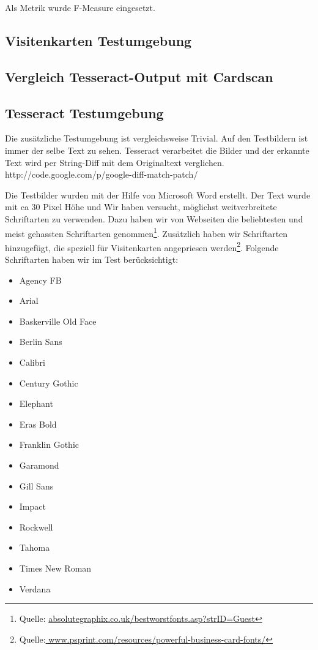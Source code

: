 \documentclass[10pt]{article}
\begin{document}
Als Metrik wurde F-Measure eingesetzt. 

\subsection{Visitenkarten Testumgebung}
\subsection{Vergleich Tesseract-Output mit Cardscan}

\subsection{Tesseract Testumgebung}
Die zusätzliche Testumgebung ist vergleichsweise Trivial. Auf den Testbildern ist immer der selbe Text zu sehen. Tesseract verarbeitet die Bilder und der erkannte Text wird per String-Diff mit dem Originaltext verglichen.
http://code.google.com/p/google-diff-match-patch/

Die Testbilder wurden mit der Hilfe von Microsoft Word erstellt. Der Text wurde mit ca 30 Pixel Höhe und 
Wir haben versucht, möglichst weitverbreitete Schriftarten zu verwenden. Dazu haben wir von Webseiten die beliebtesten und meist gehassten Schriftarten genommen\footnote{Quelle: \url{absolutegraphix.co.uk/bestworstfonts.asp?strID=Guest}}.  
Zusätzlich haben wir Schriftarten hinzugefügt, die speziell für Visitenkarten angepriesen werden\footnote{Quelle:\url{ www.psprint.com/resources/powerful-business-card-fonts/}}. Folgende Schriftarten haben wir im Test berücksichtigt:
\begin{itemize}
\item Agency FB
\item Arial
\item Baskerville Old Face
\item Berlin Sans
\item Calibri
\item Century Gothic
\item Elephant
\item Eras Bold
\item Franklin Gothic
\item Garamond
\item Gill Sans
\item Impact
\item Rockwell
\item Tahoma
\item Times New Roman
\item Verdana
\end{itemize}
\end{document}

